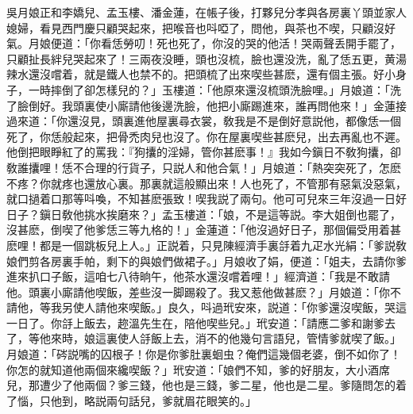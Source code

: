 吳月娘正和李嬌兒、孟玉樓、潘金蓮，在帳子後，打夥兒分孝與各房裏丫頭並家人媳婦，看見西門慶只顧哭起來，把喉音也呌啞了，問他，與茶也不喫，只顧沒好氣。月娘便道：「你看恁勞叨！死也死了，你沒的哭的他活！哭兩聲丢開手罷了，只顧扯長絆兒哭起來了！三兩夜没睡，頭也沒梳，臉也還没洗，亂了恁五更，黄湯辣水還沒嚐着，就是鐵人也禁不的。把頭梳了出來喫些甚麽，還有個主張。好小身子，一時摔倒了卻怎樣兒的？」玉樓道：「他原來還沒梳頭洗臉哩。」月娘道：「洗了臉倒好。我頭裏使小廝請他後邊洗臉，他把小廝踢進來，誰再問他來！」金蓮接過來道：「你還沒見，頭裏進他屋裏尋衣裳，敎我是不是倒好意説他，都像恁一個死了，你恁般起來，把骨禿肉兒也沒了。你在屋裏喫些甚麽兒，出去再亂也不遲。他倒把眼睜紅了的罵我：『狗攮的淫婦，管你甚麽事！』我如今鎭日不敎狗攮，卻敎誰攮哩！恁不合理的行貨子，只説人和他合氣！」月娘道：「熱突突死了，怎麽不疼？你就疼也還放心裏。那裏就這般顯出來！人也死了，不管那有惡氣没惡氣，就口撾着口那等呌喚，不知甚麽張致！喫我説了兩句。他可可兒來三年沒過一日好日子？鎭日敎他挑水挨磨來？」孟玉樓道：「娘，不是這等説。李大姐倒也罷了，沒甚麽，倒喫了他爹恁三等九格的！」金蓮道：「他沒過好日子，那個偏受用着甚麽哩！都是一個跳板兒上人。」正説着，只見陳經濟手裏㧱着九疋水光絹：「爹説敎娘們剪各房裏手帕，剩下的與娘們做裙子。」月娘收了娟，便道：「姐夫，去請你爹進來扒口子飯，這咱七八待晌午，他茶水還沒嚐着哩！」經濟道：「我是不敢請他。頭裏小廝請他喫飯，差些沒一脚踢殺了。我又惹他做甚麽？」月娘道：「你不請他，等我另使人請他來喫飯。」良久，呌過玳安來，説道：「你爹還沒喫飯，哭這一日了。你㧱上飯去，趂溫先生在，陪他喫些兒。」玳安道：「請應二爹和謝爹去了，等他來時，娘這裏使人㧱飯上去，消不的他幾句言語兒，管情爹就喫了飯。」月娘道：「硶説嘴的囚根子！你是你爹肚裏蛔虫？俺們這幾個老婆，倒不如你了！你怎的就知道他兩個來纔喫飯？」玳安道：「娘們不知，爹的好朋友，大小酒席兒，那遭少了他兩個？爹三錢，他也是三錢，爹二星，他也是二星。爹隨問怎的着了惱，只他到，略説兩句話兒，爹就眉花眼笑的。」

